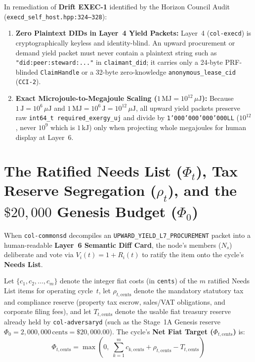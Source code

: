 \begin{invariant}
\label{inv:l7-exec-yield-fix}
In remediation of \textbf{Drift EXEC-1} identified by the Horizon Council Audit (\texttt{execd\_self\_host.hpp:324--328}):
\begin{enumerate}
    \item \textbf{Zero Plaintext DIDs in Layer~4 Yield Packets:} Layer~4 (\texttt{col-execd}) is cryptographically keyless and identity-blind. An upward procurement or demand yield packet must never contain a plaintext string such as \texttt{"did:peer:steward:..."} in \texttt{claimant\_did}; it carries only a 24-byte PRF-blinded \texttt{ClaimHandle} or a 32-byte zero-knowledge \texttt{anonymous\_lease\_cid} (\texttt{CCI-2}).
    \item \textbf{Exact Microjoule-to-Megajoule Scaling ($1\,\mathrm{MJ} = 10^{12}\,\mu\mathrm{J}$):} Because $1\,\mathrm{J} = 10^6\,\mu\mathrm{J}$ and $1\,\mathrm{MJ} = 10^6\,\mathrm{J} = 10^{12}\,\mu\mathrm{J}$, all upward yield packets preserve raw \texttt{int64\_t required\_exergy\_uj} and divide by \texttt{1'000'000'000'000LL} ($10^{12}$, never $10^9$ which is $1\,\mathrm{kJ}$) only when projecting whole megajoules for human display at Layer~6.
\end{enumerate}
\end{invariant}

\section{The Ratified Needs List ($\Phi_t$), Tax Reserve Segregation ($\rho_t$), and the $\$20{,}000$ Genesis Budget ($\Phi_0$)}
\label{sec:l7-needs-list-equations}

When \texttt{col-commonsd} decompiles an \texttt{UPWARD\_YIELD\_L7\_PROCUREMENT} packet into a human-readable \textbf{Layer~6 Semantic Diff Card}, the node's members ($N_s$) deliberate and vote via $V_i(t) = 1 + R_i(t)$ to ratify the item onto the cycle's \textbf{Needs List}.

Let $\{c_1, c_2, \dots, c_m\}$ denote the integer fiat costs (in \texttt{cents}) of the $m$ ratified Needs List items for operating cycle~$t$, let $\rho_{t,\mathrm{cents}}$ denote the mandatory statutory tax and compliance reserve (property tax escrow, sales/VAT obligations, and corporate filing fees), and let $T_{t,\mathrm{cents}}$ denote the usable fiat treasury reserve already held by \texttt{col-adversaryd} (such as the Stage~1A Genesis reserve $\Phi_0 = 2{,}000{,}000\,\text{cents} = \$20{,}000.00$). The cycle's \textbf{Net Fiat Target ($\Phi_{t,\mathrm{cents}}$)} is:
\begin{equation}
\Phi_{t,\mathrm{cents}} = \max\!\left(0,\; \sum_{k=1}^{m} c_{k,\mathrm{cents}} + \rho_{t,\mathrm{cents}} - T_{t,\mathrm{cents}}\right)
\label{eq:ch6-fiat-target-cents}
\end{equation}

